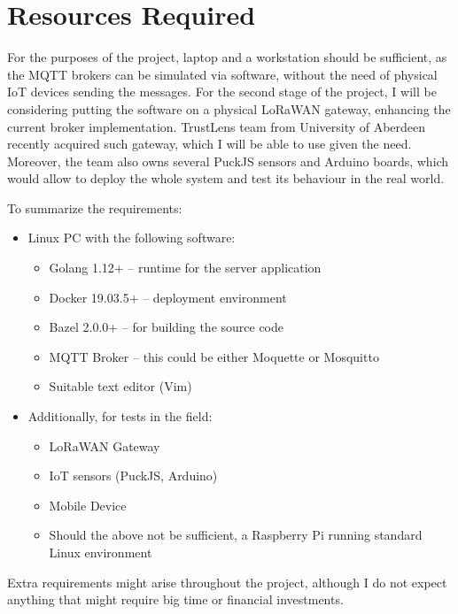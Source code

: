 \documentclass[a4paper,12pt]{article}
\begin{document}
\section*{Resources Required}

For the purposes of the project, laptop and a workstation should be sufficient, as the MQTT brokers can be simulated via software, without the need of physical IoT devices sending the messages. For the second stage of the project, I will be considering putting the software on a physical LoRaWAN gateway, enhancing the current broker implementation. TrustLens team from University of Aberdeen recently acquired such gateway, which I will be able to use given the need. Moreover, the team also owns several PuckJS sensors and Arduino boards, which would allow to deploy the whole system and test its behaviour in the real world.

To summarize the requirements:
\begin{itemize}
  \item Linux PC with the following software: 
    \begin{itemize}
      \item Golang 1.12+ -- runtime for the server application
      \item Docker 19.03.5+ -- deployment environment
      \item Bazel 2.0.0+ -- for building the source code
      \item MQTT Broker -- this could be either Moquette or Mosquitto
      \item Suitable text editor (Vim)
    \end{itemize}
  \item Additionally, for tests in the field:
    \begin{itemize}
      \item LoRaWAN Gateway
      \item IoT sensors (PuckJS, Arduino) 
      \item Mobile Device
      \item Should the above not be sufficient, a Raspberry Pi running standard Linux environment
    \end{itemize}
\end{itemize}

Extra requirements might arise throughout the project, although I do not expect anything that might require big time or financial investments.
\end{document}
